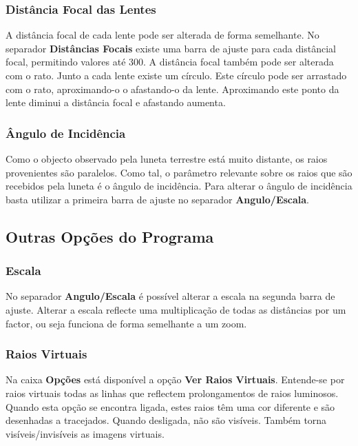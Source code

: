 \documentclass[a4paper,12pt]{article}
\begin{document}
\subsubsection{Distância Focal das Lentes}

A distância focal de cada lente pode ser alterada de forma semelhante. No separador {\bf Distâncias Focais} existe uma barra de ajuste para cada distâncial focal, permitindo valores até 300.
A distância focal também pode ser alterada com o rato. Junto a cada lente existe um círculo. Este círculo pode ser arrastado com o rato, aproximando-o o afastando-o da lente. Aproximando este ponto da lente diminui a distância focal e afastando aumenta.
\par 

\subsubsection{Ângulo de Incidência}

Como o objecto observado pela luneta terrestre está muito distante, os raios provenientes são paralelos. Como tal, o parâmetro relevante sobre os raios que são recebidos pela luneta é o ângulo de incidência. Para alterar o ângulo de incidência basta utilizar a primeira barra de ajuste no separador {\bf Angulo/Escala}.

\subsection{Outras Opções do Programa}

\subsubsection{Escala}

No separador {\bf Angulo/Escala} é possível alterar a escala na segunda barra de ajuste. Alterar a escala reflecte uma multiplicação de todas as distâncias por um factor, ou seja funciona de forma semelhante a um zoom.
\par

\subsubsection{Raios Virtuais}

Na caixa {\bf Opções} está disponível a opção {\bf Ver Raios Virtuais}. Entende-se por raios virtuais todas as linhas que reflectem prolongamentos de raios luminosos. Quando esta opção se encontra ligada, estes raios têm uma cor diferente e são desenhadas a tracejados. Quando desligada, não são visíveis. Também torna visíveis/invisíveis as imagens virtuais.
\par
\end{document}
